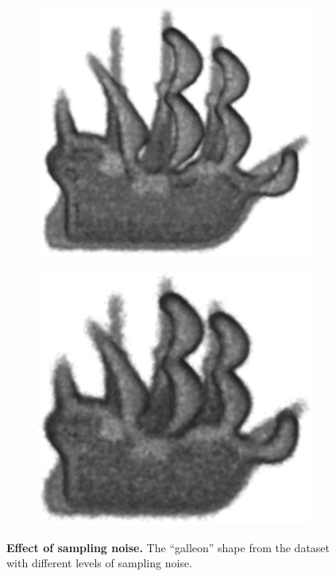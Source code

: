 \begin{figure}[ht]
\begin{subfigure}[t]{0.33\linewidth}
		\label{fig/eval/noise_low}
	\end{subfigure}
	\begin{subfigure}[t]{0.33\linewidth}\centering
		\includegraphics[width=1\linewidth]{./fig/eval/noise_mid.png}
		\label{fig/eval/noise_mid}
	\end{subfigure}
	\begin{subfigure}[t]{0.33\linewidth}\centering
		\includegraphics[width=1\linewidth]{./fig/eval/noise_high.png}
		\label{fig/eval/noise_high}
	\end{subfigure}
	\caption{\textbf{Effect of sampling noise.} The ``galleon'' shape from the \meshset dataset with different levels of sampling noise.}
	\label{fig/eval/noisesample}
\end{figure}

